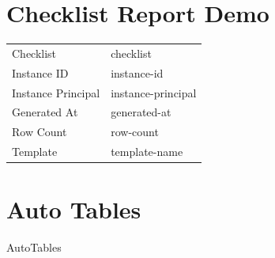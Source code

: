 \documentclass[11pt]{article}
\begin{document}
\section*{Checklist Report Demo}

\begin{tabular}{ll}
Checklist & {{checklist}} \\
Instance ID & {{instance-id}} \\
Instance Principal & {{instance-principal}} \\
Generated At & {{generated-at}} \\
Row Count & {{row-count}} \\
Template & {{template-name}} \\
\end{tabular}

\section*{Auto Tables}
{{AutoTables}}
\end{document}
